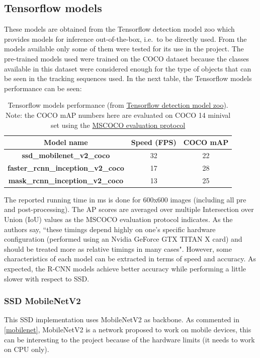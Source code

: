 \subsection{Tensorflow models} \label{tf_models}
These models are obtained from the Tensorflow detection model zoo which provides models for inference out-of-the-box, i.e.\ to be directly used. From the models available only some of them were tested for its use in the project. The pre-trained models used were trained on the COCO dataset because the classes available in this dataset were considered enough for the type of objects that can be seen in the tracking sequences used. In the next table, the Tensorflow models performance can be seen:
\begin{table}[H]
\begin{center}
\begin{tabular}{|c|c|c|}
\hline
Model name                                 & Speed (FPS) & COCO mAP \\ \hline
\textbf{ssd\_mobilenet\_v2\_coco}          & 32         & 22       \\ \hline
\textbf{faster\_rcnn\_inception\_v2\_coco} & 17         & 28       \\ \hline
\textbf{mask\_rcnn\_inception\_v2\_coco}   & 13         & 25       \\ \hline
\end{tabular}
\end{center}
\caption{Tensorflow models performance (from \href{https://github.com/tensorflow/models/blob/master/research/object_detection/g3doc/detection_model_zoo.md#coco-trained-models}{Tensorflow detection model zoo}). Note: the COCO mAP numbers here are evaluated on COCO 14 minival set using the \href{http://cocodataset.org/#detection-eval}{MSCOCO evaluation protocol}}
\end{table}
The reported running time in ms is done for 600x600 images (including all pre and post-processing). The AP scores are averaged over multiple Intersection over Union (IoU) values as the MSCOCO evaluation protocol indicates. As the authors say, ``these timings depend highly on one's specific hardware configuration (performed using an Nvidia GeForce GTX TITAN X card) and should be treated more as relative timings in many cases". However, some characteristics of each model can be extracted in terms of speed and accuracy. As expected, the R-CNN models achieve better accuracy while performing a little slower with respect to SSD.

\subsubsection{SSD MobileNetV2}
This SSD implementation uses MobileNetV2 as backbone. As commented in \ref{mobilenet}, MobileNetV2 is a network proposed to work on mobile devices, this can be interesting to the project because of the hardware limits (it needs to work on CPU only).
